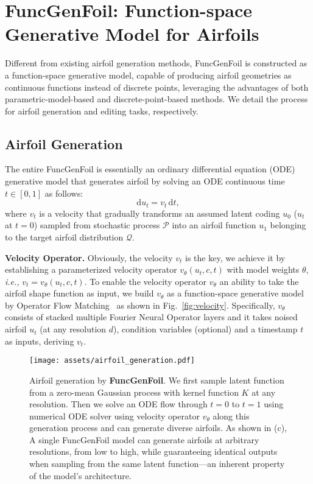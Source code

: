 \section{FuncGenFoil: Function-space Generative Model for Airfoils}

Different from existing airfoil generation methods, 
FuncGenFoil is constructed as a function-space generative model, capable of producing airfoil geometries as continuous functions instead of discrete points, leveraging the advantages of both parametric-model-based and discrete-point-based methods.  
We detail the process for airfoil generation and editing tasks, respectively.

\subsection{Airfoil Generation}
The entire FuncGenFoil is essentially an ordinary differential equation (ODE) generative model that generates airfoil by solving an ODE continuous time $t \in [0,1]$ as follows:
\begin{equation}\label{eq:ode}
    \mathrm{d}u_t = v_t\,\mathrm{d}t,
\end{equation}
%
where $v_t$ is a velocity that gradually transforms an assumed latent coding $u_0$ ($u_t$ at $t=0$) sampled from stochastic process $\mathcal{P}$ into an airfoil function $u_1$ belonging to the target airfoil distribution $\mathcal{Q}$.

\noindent \textbf{Velocity Operator.} 
Obviously, the velocity $v_t$ is the key, we achieve it by establishing a parameterized velocity operator $v_{\theta}(u_t,c,t)$ with model weights $\theta$, \emph{i.e.,} $v_t=v_{\theta}(u_t,c, t)$. 
To enable the velocity operator $v_{\theta}$ an ability to take the airfoil shape function as input, we build $v_{\theta}$ as a function-space generative model by Operator Flow Matching~\cite{shi2025stochasticprocesslearningoperator} as shown in Fig.~\ref{fig:velocity}. Specifically, 
$v_{\theta}$ consists of stacked multiple Fourier Neural Operator layers and it takes noised airfoil $u_t$ (at any resolution $d$), condition variables (optional) and a timestamp $t$ as inputs, deriving $v_t$.


\begin{figure*}[t]
    \small
    \centering
    \texttt{[image: assets/airfoil\_generation.pdf]}
    \caption{Airfoil generation by \textbf{FuncGenFoil}. We first sample latent function from a zero-mean Gaussian process with kernel function $K$ at any resolution. 
    Then we solve an ODE flow through $t=0$ to $t=1$ using numerical ODE solver using velocity operator $v_{\theta}$ along this generation process and can generate diverse airfoils.
    As shown in (c), A single FuncGenFoil model can generate airfoils at arbitrary resolutions, from low to high, while guaranteeing identical outputs when sampling from the same latent function—an inherent property of the model's architecture.}
    \label{fig:generation}
    \vspace{-15pt}
\end{figure*}

